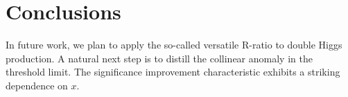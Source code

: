 \section{Conclusions}\label{sec:conclusions}

In future work, we plan to apply the so-called versatile R-ratio to
double Higgs production. A natural next step is to distill the collinear
anomaly in the threshold limit. The significance improvement
characteristic exhibits a striking dependence on $x$.

